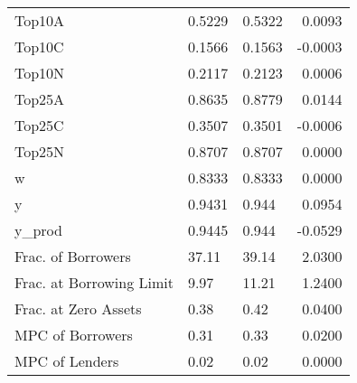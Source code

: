 \begin{table}
\begin{tabular}{lllr}
                  Top10A &  0.5229 &   0.5322 &  0.0093 \\
                  Top10C &  0.1566 &   0.1563 & -0.0003 \\
                  Top10N &  0.2117 &   0.2123 &  0.0006 \\
                  Top25A &  0.8635 &   0.8779 &  0.0144 \\
                  Top25C &  0.3507 &   0.3501 & -0.0006 \\
                  Top25N &  0.8707 &   0.8707 &  0.0000 \\
                       w &  0.8333 &   0.8333 &  0.0000 \\
                       y &  0.9431 &    0.944 &  0.0954 \\
                  y\_prod &  0.9445 &    0.944 & -0.0529 \\
      Frac. of Borrowers &   37.11 &    39.14 &  2.0300 \\
Frac. at Borrowing Limit &    9.97 &    11.21 &  1.2400 \\
    Frac. at Zero Assets &    0.38 &     0.42 &  0.0400 \\
        MPC of Borrowers &    0.31 &     0.33 &  0.0200 \\
          MPC of Lenders &    0.02 &     0.02 &  0.0000 \\
\bottomrule
\end{tabular}
\end{table}
